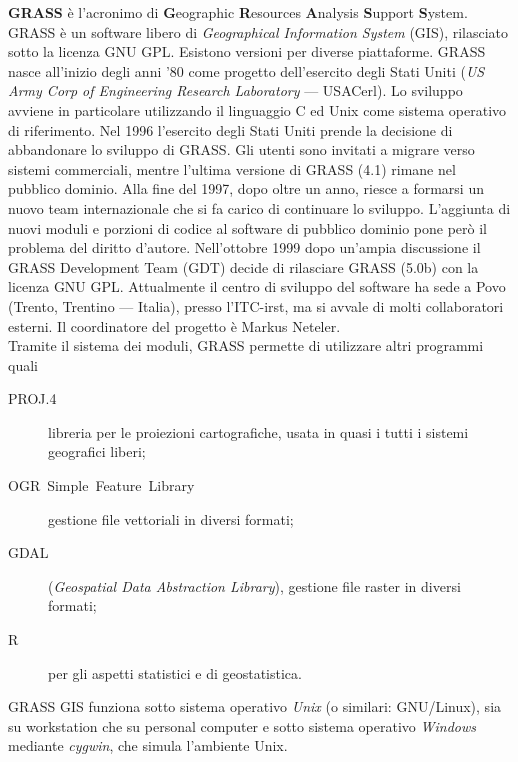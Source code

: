 	\textbf{GRASS} è l'acronimo di \textbf{G}eographic \textbf{R}esources \textbf{A}nalysis \textbf{S}upport \textbf{S}ystem. GRASS è un software libero di \emph{Geographical Information System} (GIS), rilasciato sotto la licenza GNU GPL. Esistono versioni per diverse piattaforme. GRASS nasce all'inizio degli anni '80 come progetto dell\textquoteright{}esercito degli Stati Uniti (\emph{US Army Corp of Engineering Research Laboratory} --- USACerl). Lo sviluppo avviene in particolare utilizzando il linguaggio C ed Unix come sistema operativo di riferimento. Nel 1996 l'esercito degli Stati Uniti prende la decisione di abbandonare lo sviluppo di GRASS. Gli utenti sono invitati a migrare verso sistemi commerciali, mentre l'ultima versione di GRASS (4.1) rimane nel pubblico dominio. Alla fine del 1997, dopo oltre un anno, riesce a formarsi un nuovo team internazionale che si fa carico di continuare lo sviluppo. L'aggiunta di nuovi moduli e porzioni di codice al software di pubblico dominio pone però il problema del diritto d'autore. Nell'ottobre 1999 dopo un'ampia discussione il GRASS Development Team (GDT) decide di rilasciare GRASS (5.0b) con la licenza GNU GPL. Attualmente il centro di sviluppo del software ha sede a Povo (Trento, Trentino --- Italia), presso l'ITC-irst, ma si avvale di molti collaboratori esterni. Il coordinatore del progetto è Markus Neteler.\\

	Tramite il sistema dei moduli, GRASS permette di utilizzare altri programmi quali

	\begin{description}
		\item [{PROJ.4}] libreria per le proiezioni cartografiche, usata in quasi i tutti i sistemi geografici liberi;
		\item [{OGR~Simple~Feature~Library}] gestione file vettoriali in diversi formati;
		\item [{GDAL}] (\emph{Geospatial Data Abstraction Library}), gestione file raster in diversi formati;
		\item [{R}] per gli aspetti statistici e di geostatistica.
	\end{description}
		
	GRASS GIS funziona sotto sistema operativo \emph{Unix} (o similari: GNU/Linux), sia su workstation che su personal computer e sotto sistema operativo \emph{Windows} mediante \emph{cygwin}, che simula l'ambiente Unix.


